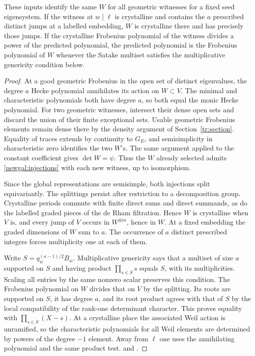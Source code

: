 \begin{proposition}\label{newgal:seed}
These inputs identify the same $W$ for all geometric witnesses for a fixed
seed eigensystem. If the witness at $w\mid\ell$ is crystalline and contains
the $a$ prescribed distinct jumps at a labelled embedding, $W$ is crystalline
there and has precisely those jumps. If the crystalline Frobenius polynomial
of the witness divides a power of the predicted polynomial, the predicted
polynomial is the Frobenius polynomial of $W$ whenever the Satake multiset
satisfies the multiplicative genericity condition below.
\end{proposition}
\begin{proof}
At a good geometric Frobenius in the open set of distinct eigenvalues,
the degree $a$ Hecke polynomial annihilates its action on $W\subset V$.
The minimal and characteristic polynomials both have degree $a$, so both
equal the monic Hecke polynomial. For two geometric witnesses, intersect
their dense open sets and discard the union of their finite exceptional
sets. Usable geometric Frobenius elements remain dense there by the density
argument of Section~\ref{tr:section}. Equality of traces extends by continuity
to $G_E$, and semisimplicity in characteristic zero identifies the two $W$'s.
The same argument applied to the constant coefficient gives $\det W=\psi$.
Thus the $W$ already selected admits \eqref{newgal:injections} with each
new witness, up to isomorphism.

Since the global representations are semisimple, both injections split
equivariantly. The splittings persist after restriction to a decomposition
group. Crystalline periods commute with finite direct sums and direct
summands, as do the labelled graded pieces of the de Rham filtration.
Hence $W$ is crystalline when $V$ is, and every jump of $V$ occurs in
$W^{\oplus m}$, hence in $W$. At a fixed embedding the graded dimensions
of $W$ sum to $a$. The occurrence of $a$ distinct prescribed integers forces
multiplicity one at each of them.

Write $S=q_w^{(a-1)/2}B_w$. Multiplicative genericity says that a multiset
of size $a$ supported on $S$ and having product $\prod_{s\in S}s$ equals
$S$, with its multiplicities. Scaling all entries by the same nonzero
scalar preserves this condition. The Frobenius polynomial on $W$ divides
that on $V$ by the splitting. Its roots are supported on $S$, it has
degree $a$, and its root product agrees with that of $S$ by the local
compatibility of the rank-one determinant character. This proves equality
with $\prod_{s\in S}(X-s)$. At a crystalline place the associated Weil
action is unramified, so the characteristic polynomials for all Weil
elements are determined by powers of the degree $-1$ element. Away from
$\ell$ one uses the annihilating polynomial and the same product test.
and .
\end{proof}

